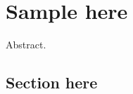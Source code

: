 \documentclass{book}
\begin{document}
\chapter{Sample here}

Abstract.
\Blindtext
\section{Section here}
\blindtext{}
\end{document}
